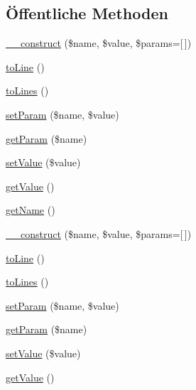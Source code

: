 \subsection*{Öffentliche Methoden}
\begin{DoxyCompactItemize}
\item 
\mbox{\hyperlink{class_eluceo_1_1i_cal_1_1_property_aeb192572ca706cb77df02d439c3f6ce4}{\+\_\+\+\_\+construct}} (\$name, \$value, \$params=\mbox{[}$\,$\mbox{]})
\item 
\mbox{\hyperlink{class_eluceo_1_1i_cal_1_1_property_a8b154e23bd0673f5afb2b6fd450991f2}{to\+Line}} ()
\item 
\mbox{\hyperlink{class_eluceo_1_1i_cal_1_1_property_a815fd5c038ec6f86b9f117f2e3d5bb7f}{to\+Lines}} ()
\item 
\mbox{\hyperlink{class_eluceo_1_1i_cal_1_1_property_a0df0ae305338da8badb77919fbd21253}{set\+Param}} (\$name, \$value)
\item 
\mbox{\hyperlink{class_eluceo_1_1i_cal_1_1_property_aa0fea66f4397d19a9c553aabd234b26e}{get\+Param}} (\$name)
\item 
\mbox{\hyperlink{class_eluceo_1_1i_cal_1_1_property_acc3c37832aaf1876944f9c13119dfb7b}{set\+Value}} (\$value)
\item 
\mbox{\hyperlink{class_eluceo_1_1i_cal_1_1_property_a2e565cd9324a1f802c741224c9c78864}{get\+Value}} ()
\item 
\mbox{\hyperlink{class_eluceo_1_1i_cal_1_1_property_ab53aefdbce4aa167f433cac2959c2c66}{get\+Name}} ()
\item 
\mbox{\hyperlink{class_eluceo_1_1i_cal_1_1_property_aeb192572ca706cb77df02d439c3f6ce4}{\+\_\+\+\_\+construct}} (\$name, \$value, \$params=\mbox{[}$\,$\mbox{]})
\item 
\mbox{\hyperlink{class_eluceo_1_1i_cal_1_1_property_a8b154e23bd0673f5afb2b6fd450991f2}{to\+Line}} ()
\item 
\mbox{\hyperlink{class_eluceo_1_1i_cal_1_1_property_a815fd5c038ec6f86b9f117f2e3d5bb7f}{to\+Lines}} ()
\item 
\mbox{\hyperlink{class_eluceo_1_1i_cal_1_1_property_a0df0ae305338da8badb77919fbd21253}{set\+Param}} (\$name, \$value)
\item 
\mbox{\hyperlink{class_eluceo_1_1i_cal_1_1_property_aa0fea66f4397d19a9c553aabd234b26e}{get\+Param}} (\$name)
\item 
\mbox{\hyperlink{class_eluceo_1_1i_cal_1_1_property_acc3c37832aaf1876944f9c13119dfb7b}{set\+Value}} (\$value)
\item 
\mbox{\hyperlink{class_eluceo_1_1i_cal_1_1_property_a2e565cd9324a1f802c741224c9c78864}{get\+Value}} ()

\end{DoxyCompactItemize}
